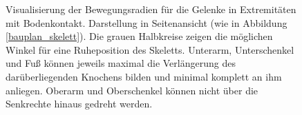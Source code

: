 \begin{figure}
  
  \caption{Visualisierung der Bewegungsradien für die Gelenke in Extremitäten mit Bodenkontakt. Darstellung in Seitenansicht (wie in Abbildung \ref{bauplan_skelett}). Die grauen Halbkreise zeigen die möglichen Winkel für eine Ruheposition des Skeletts. Unterarm, Unterschenkel und Fuß können jeweils maximal die Verlängerung des darüberliegenden Knochens bilden und minimal komplett an ihm anliegen. Oberarm und Oberschenkel können nicht über die Senkrechte hinaus gedreht werden.}
  \label{joints}
 \end{figure}


